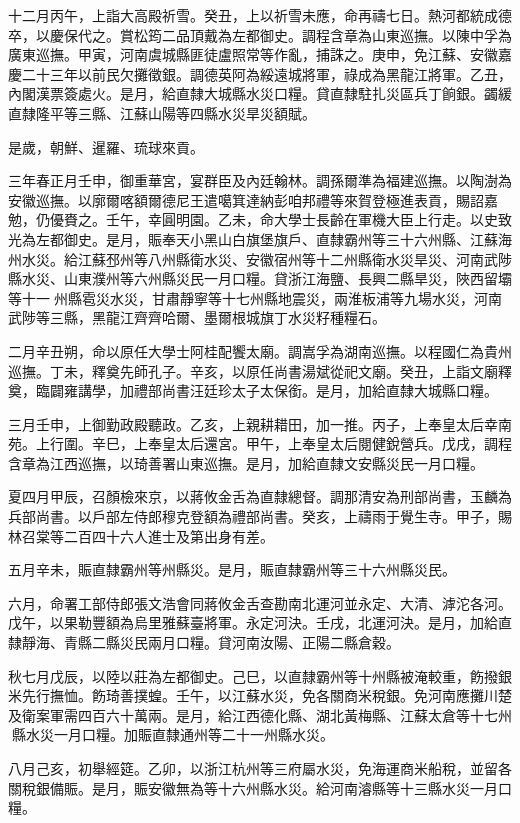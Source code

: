 \begin{pinyinscope}
十二月丙午，上詣大高殿祈雪。癸丑，上以祈雪未應，命再禱七日。熱河都統成德卒，以慶保代之。賞松筠二品頂戴為左都御史。調程含章為山東巡撫。以陳中孚為廣東巡撫。甲寅，河南虞城縣匪徒盧照常等作亂，捕誅之。庚申，免江蘇、安徽嘉慶二十三年以前民欠攤徵銀。調德英阿為綏遠城將軍，祿成為黑龍江將軍。乙丑，內閣漢票簽處火。是月，給直隸大城縣水災口糧。貸直隸駐扎災區兵丁餉銀。蠲緩直隸隆平等三縣、江蘇山陽等四縣水災旱災額賦。

是歲，朝鮮、暹羅、琉球來貢。

三年春正月壬申，御重華宮，宴群臣及內廷翰林。調孫爾準為福建巡撫。以陶澍為安徽巡撫。以廓爾喀額爾德尼王遣噶箕達納彭咱邦禮等來賀登極進表貢，賜詔嘉勉，仍優賚之。壬午，幸圓明園。乙未，命大學士長齡在軍機大臣上行走。以史致光為左都御史。是月，賑奉天小黑山白旗堡旗戶、直隸霸州等三十六州縣、江蘇海州水災。給江蘇邳州等八州縣衛水災、安徽宿州等十二州縣衛水災旱災、河南武陟縣水災、山東濮州等六州縣災民一月口糧。貸浙江海鹽、長興二縣旱災，陜西留壩等十一州縣雹災水災，甘肅靜寧等十七州縣地震災，兩淮板浦等九場水災，河南武陟等三縣，黑龍江齊齊哈爾、墨爾根城旗丁水災籽種糧石。

二月辛丑朔，命以原任大學士阿桂配饗太廟。調嵩孚為湖南巡撫。以程國仁為貴州巡撫。丁未，釋奠先師孔子。辛亥，以原任尚書湯斌從祀文廟。癸丑，上詣文廟釋奠，臨闢雍講學，加禮部尚書汪廷珍太子太保銜。是月，加給直隸大城縣口糧。

三月壬申，上御勤政殿聽政。乙亥，上親耕耤田，加一推。丙子，上奉皇太后幸南苑。上行圍。辛巳，上奉皇太后還宮。甲午，上奉皇太后閱健銳營兵。戊戌，調程含章為江西巡撫，以琦善署山東巡撫。是月，加給直隸文安縣災民一月口糧。

夏四月甲辰，召顏檢來京，以蔣攸金舌為直隸總督。調那清安為刑部尚書，玉麟為兵部尚書。以戶部左侍郎穆克登額為禮部尚書。癸亥，上禱雨于覺生寺。甲子，賜林召棠等二百四十六人進士及第出身有差。

五月辛未，賑直隸霸州等州縣災。是月，賑直隸霸州等三十六州縣災民。

六月，命署工部侍郎張文浩會同蔣攸金舌查勘南北運河並永定、大清、滹沱各河。戊午，以果勒豐額為烏里雅蘇臺將軍。永定河決。壬戌，北運河決。是月，加給直隸靜海、青縣二縣災民兩月口糧。貸河南汝陽、正陽二縣倉穀。

秋七月戊辰，以陸以莊為左都御史。己巳，以直隸霸州等十州縣被淹較重，飭撥銀米先行撫恤。飭琦善撲蝗。壬午，以江蘇水災，免各關商米稅銀。免河南應攤川楚及衛案軍需四百六十萬兩。是月，給江西德化縣、湖北黃梅縣、江蘇太倉等十七州縣水災一月口糧。加賑直隸通州等二十一州縣水災。

八月己亥，初舉經筵。乙卯，以浙江杭州等三府屬水災，免海運商米船稅，並留各關稅銀備賑。是月，賑安徽無為等十六州縣水災。給河南濬縣等十三縣水災一月口糧。


\end{pinyinscope}
